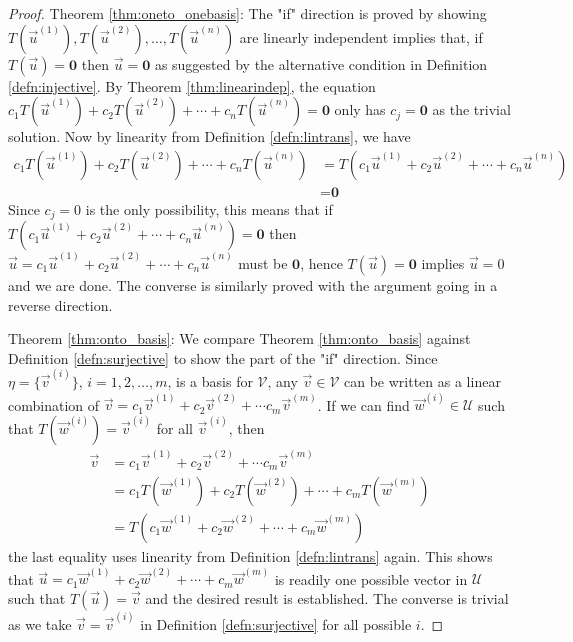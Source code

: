 \begin{proof}
Theorem \ref{thm:oneto_onebasis}: The "if" direction is proved by showing $T(\vec{u}^{(1)}), T(\vec{u}^{(2)}),\allowbreak \ldots, T(\vec{u}^{(n)})$ are linearly independent implies that, if $T(\vec{u}) = \textbf{0}$ then $\vec{u} = \textbf{0}$ as suggested by the alternative condition in Definition \ref{defn:injective}. By Theorem \ref{thm:linearindep}, the equation $c_1T(\vec{u}^{(1)}) + c_2T(\vec{u}^{(2)}) + \cdots + c_nT(\vec{u}^{(n)}) = \textbf{0}$ only has $c_j = \textbf{0}$ as the trivial solution. Now by linearity from Definition \ref{defn:lintrans}, we have
\begin{align*}
c_1T(\vec{u}^{(1)}) + c_2T(\vec{u}^{(2)}) + \cdots + c_nT(\vec{u}^{(n)}) &= T(c_1\vec{u}^{(1)} + c_2\vec{u}^{(2)} + \cdots + c_n\vec{u}^{(n)}) \\
&= \textbf{0}    
\end{align*}
Since $c_j = 0$ is the only possibility, this means that if $T(c_1\vec{u}^{(1)} + c_2\vec{u}^{(2)} + \cdots + c_n\vec{u}^{(n)}) = \textbf{0}$ then $\vec{u} = c_1\vec{u}^{(1)} + c_2\vec{u}^{(2)} + \cdots + c_n\vec{u}^{(n)}$ must be $\textbf{0}$, hence $T(\vec{u}) = \textbf{0}$ implies $\vec{u} = 0$ and we are done. The converse is similarly proved with the argument going in a reverse direction. \par
Theorem \ref{thm:onto_basis}: We compare Theorem \ref{thm:onto_basis} against Definition \ref{defn:surjective} to show the part of the "if" direction. Since $\eta = \{\vec{v}^{(i)}\}$, $i = 1,2,\ldots,m$, is a basis for $\mathcal{V}$, any $\vec{v} \in \mathcal{V}$ can be written as a linear combination of $\vec{v} = c_1\vec{v}^{(1)} + c_2\vec{v}^{(2)} + \cdots c_m\vec{v}^{(m)}$. If we can find $\vec{w}^{(i)} \in \mathcal{U}$ such that $T(\vec{w}^{(i)}) = \vec{v}^{(i)}$ for all $\vec{v}^{(i)}$, then
\begin{align*}
\vec{v} &= c_1\vec{v}^{(1)} + c_2\vec{v}^{(2)} + \cdots c_m\vec{v}^{(m)}\\
&= c_1T(\vec{w}^{(1)}) + c_2T(\vec{w}^{(2)}) + \cdots + c_mT(\vec{w}^{(m)}) \\
&= T(c_1\vec{w}^{(1)} + c_2\vec{w}^{(2)} + \cdots + c_m\vec{w}^{(m)})
\end{align*}
the last equality uses linearity from Definition \ref{defn:lintrans} again. This shows that $\vec{u} = c_1\vec{w}^{(1)} + c_2\vec{w}^{(2)} + \cdots + c_m\vec{w}^{(m)}$ is readily one possible vector in $\mathcal{U}$ such that $T(\vec{u}) = \vec{v}$ and the desired result is established. The converse is trivial as we take $\vec{v} = \vec{v}^{(i)}$ in Definition \ref{defn:surjective} for all possible $i$.
\end{proof}

